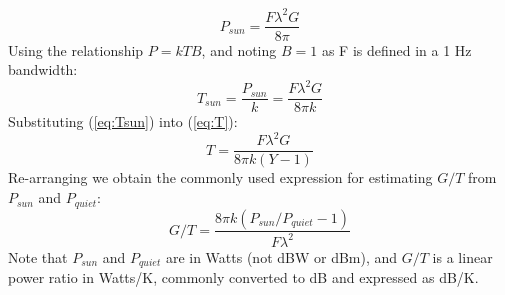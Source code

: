 \documentclass{article}
\begin{document}
\begin{equation}
P_{sun} = \frac{F\lambda^2G}{8\pi}
\end{equation}
Using the relationship $P=kTB$, and noting $B=1$ as F is defined in a 1 Hz bandwidth:
\begin{equation} \label{eq:Tsun}
T_{sun} = \frac{P_{sun}}{k} = \frac{F\lambda^2G}{8\pi k}
\end{equation}
Substituting (\ref{eq:Tsun}) into (\ref{eq:T}):
\begin{equation}
T = \frac{F\lambda^2G}{8\pi k(Y-1)}
\end{equation}
Re-arranging we obtain the commonly used expression for estimating $G/T$ from $P_{sun}$ and $P_{quiet}$:
\begin{equation}
G/T = \frac{8\pi k(P_{sun}/P_{quiet}-1)}{F\lambda^2}
\end{equation}
Note that $P_{sun}$ and $P_{quiet}$ are in Watts (not dBW or dBm), and $G/T$ is a linear power ratio in Watts/K, commonly converted to dB and expressed as dB/K.


\end{document}
